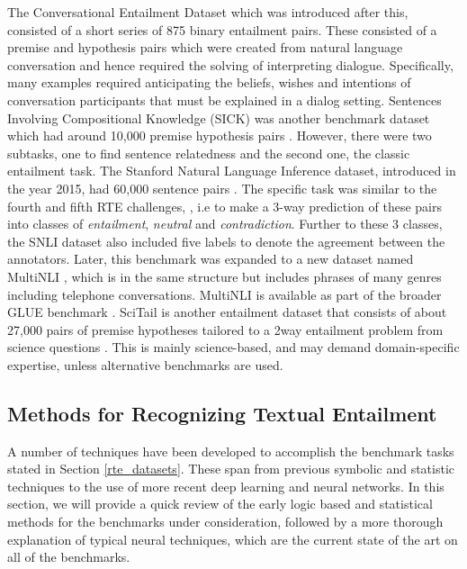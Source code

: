 The Conversational Entailment Dataset \citep{zhang2010towards} which was introduced after this, consisted  of a short series of 875 binary entailment pairs. These consisted of a premise and hypothesis pairs which were created from natural language conversation and hence required the solving of interpreting dialogue. Specifically, many examples required anticipating the beliefs, wishes and intentions of conversation participants that must be explained in a dialog setting.
Sentences Involving Compositional Knowledge (SICK) was another benchmark dataset which had around 10,000 premise hypothesis pairs \citep{marelli2014sick}.
However, there were two subtasks, one to find sentence relatedness and the second one, the classic entailment task. The Stanford Natural Language Inference dataset, introduced in the year 2015, had 60,000 sentence pairs \citep{bowman2015large}. The specific task was similar to the fourth and fifth RTE challenges, \citep{bentivogli2009fifth,giampiccolo2008fourth}, i.e to make a 3-way prediction of these pairs into classes of \textit{entailment}, \textit{neutral} and \textit{contradiction}. Further to these 3 classes, the SNLI dataset also included five labels to denote the agreement between the annotators. Later, this benchmark was expanded to a new dataset named MultiNLI \citep{williams2017broad}, which is in the same structure but includes phrases of many genres including telephone conversations. MultiNLI is available as part of the broader GLUE benchmark \citep{wang2018glue}. SciTail is another entailment dataset that consists of about 27,000 pairs of premise hypotheses tailored to a 2way entailment problem from science questions \citep{khot2018scitail}. This is mainly science-based, and may demand domain-specific expertise, unless alternative benchmarks are used.


\subsection{Methods for Recognizing Textual Entailment}
\label{rte_methods}

A number of techniques have been developed to accomplish the benchmark tasks stated in Section \ref{rte_datasets}. These span from previous symbolic and statistic techniques to the use of more recent deep learning and neural networks. In this section, we will provide a quick review of the early logic based and statistical methods for the benchmarks under consideration, followed by a more thorough explanation of typical neural techniques, which are the current state of the art on all of the benchmarks.

